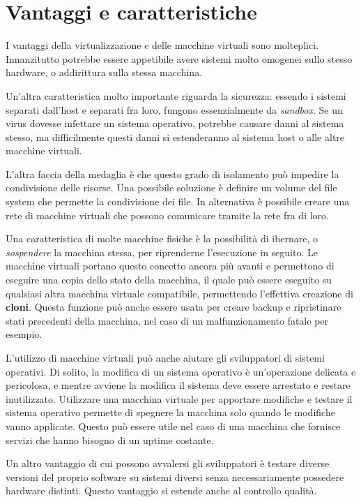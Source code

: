 \section{Vantaggi e caratteristiche}
    I vantaggi della virtualizzazione e delle macchine virtuali sono molteplici. Innanzitutto potrebbe essere appetibile avere sistemi molto omogenei sullo stesso hardware, o addirittura sulla stessa macchina.
    
    Un'altra caratteristica molto importante riguarda la sicurezza: essendo i sistemi separati dall'host e separati fra loro, fungono essenzialmente da \textit{sandbox}. Se un virus dovesse infettare un sistema operativo, potrebbe causare danni al sistema stesso, ma difficilmente questi danni si estenderanno al sistema host o alle altre macchine virtuali.
    
    L'altra faccia della medaglia è che questo grado di isolamento può impedire la condivisione delle risorse. Una possibile soluzione è definire un volume del file system che permette la condivisione dei file. In alternativa è possibile creare una rete di macchine virtuali che possono comunicare tramite la rete fra di loro.
    
    Una caratteristica di molte macchine fisiche è la possibilità di ibernare, o \textit{sospendere} la macchina stessa, per riprenderne l'esecuzione in seguito. Le macchine virtuali portano questo concetto ancora più avanti e permettono di eseguire una copia dello stato della macchina, il quale può essere eseguito su qualsiasi altra macchina virtuale compatibile, permettendo l'effettiva creazione di \textbf{cloni}. Questa funzione può anche essere usata per creare backup e ripristinare stati precedenti della macchina, nel caso di un malfunzionamento fatale per esempio.
    
    L'utilizzo di macchine virtuali può anche aiutare gli sviluppatori di sistemi operativi. Di solito, la modifica di un sistema operativo è un'operazione delicata e pericolosa, e mentre avviene la modifica il sistema deve essere arrestato e restare inutilizzato. Utilizzare una macchina virtuale per apportare modifiche e testare il sistema operativo permette di spegnere la macchina solo quando le modifiche vanno applicate. Questo può essere utile nel caso di una macchina che fornisce servizi che hanno bisogno di un uptime costante.
    
    Un altro vantaggio di cui possono avvalersi gli sviluppatori è testare diverse versioni del proprio software su sistemi diversi senza necessariamente possedere hardware distinti. Questo vantaggio si estende anche al controllo qualità.
    
